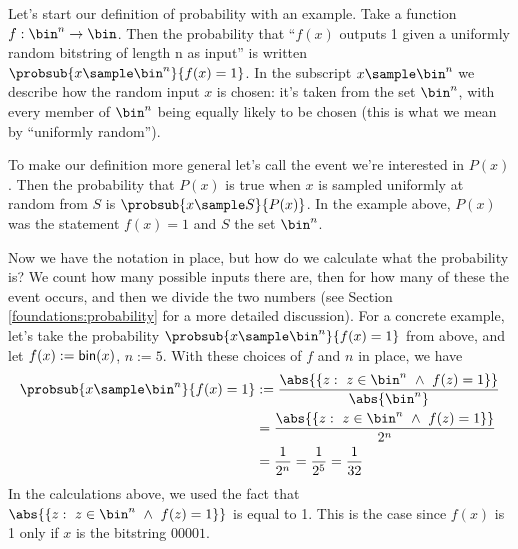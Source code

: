Let's start our definition of probability with an example. Take a function $f: \bin^n \rightarrow \bin$. Then the probability that ``$f(x)$ outputs 1 given a uniformly random bitstring of length n as input'' is written \(\probsub{x \sample \bin^n}{f(x) = 1}\). In the subscript $x \sample \bin^n$ we describe how the random input $x$ is chosen: it's taken from the set $\bin^n$, with every member of $\bin^n$ being equally likely to be chosen (this is what we mean by ``uniformly random''). 

To make our definition more general let's call the event we're interested in $P(x)$. Then the probability that $P(x)$ is true when $x$ is sampled uniformly at random from $S$ is \(\probsub{x \sample S}{P(x)}\). In the example above, $P(x)$ was the statement $f(x) = 1$ and $S$ the set $\bin^n$.

Now we have the notation in place, but how do we calculate what the probability is? We count how many possible inputs there are, then for how many of these the event occurs, and then we divide the two numbers (see Section \ref{foundations:probability} for a more detailed discussion). For a concrete example, let's take the probability \(\probsub{x \sample \bin^n}{f(x) = 1}\) from above, and let $f(x) := \textsf{bin}(x)$, $n := 5$. With these choices of $f$ and $n$ in place, we have
\begin{align*}
  \probsub{x\sample \bin^n}{f(x)=1} & :=\frac{\abs{\{z:\  z\in\bin^n\ \wedge \ f(z)=1\}}}{\abs{\bin^n}} \\
                                    & =\frac{\abs{\{z:\  z\in\bin^n\ \wedge \ f(z)=1\}}}{2^n} \\
                                    & =\frac{1}{2^n} = \frac{1}{2^5} = \frac{1}{32} 
\end{align*}
In the calculations above, we used the fact that $\abs{\{z:\  z\in\bin^n\ \wedge \ f(z)=1\}}$ is equal to 1. This is the case since $f(x)$ is 1 only if $x$ is the bitstring $00001$.